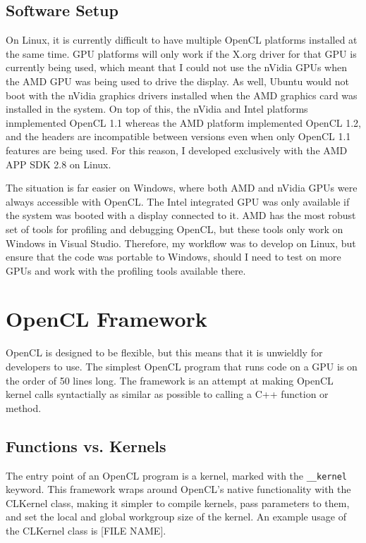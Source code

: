 \documentclass{article}
\begin{document}
\subsection{Software Setup}
On Linux, it is currently difficult to have multiple OpenCL platforms installed at the same time. GPU platforms will only work if the X.org driver for that GPU is currently being used, which meant that I could not use the nVidia GPUs when the AMD GPU was being used to drive the display. As well, Ubuntu would not boot with the nVidia graphics drivers installed when the AMD graphics card was installed in the system. On top of this, the nVidia and Intel platforms inmplemented OpenCL 1.1 whereas the AMD platform implemented OpenCL 1.2, and the headers are incompatible between versions even when only OpenCL 1.1 features are being used. For this reason, I developed exclusively with the AMD APP SDK 2.8 on Linux.

The situation is far easier on Windows, where both AMD and nVidia GPUs were always accessible with OpenCL. The Intel integrated GPU was only available if the system was booted with a display connected to it. AMD has the most robust set of tools for profiling and debugging OpenCL, but these tools only work on Windows in Visual Studio. Therefore, my workflow was to develop on Linux, but ensure that the code was portable to Windows, should I need to test on more GPUs and work with the profiling tools available there.

\section{OpenCL Framework}
OpenCL is designed to be flexible, but this means that it is unwieldly for developers to use. The simplest OpenCL program that runs code on a GPU is on the order of 50 lines long. The framework is an attempt at making OpenCL kernel calls syntactially as similar as possible to calling a C++ function or method.

\subsection{Functions vs. Kernels}
The entry point of an OpenCL program is a kernel, marked with the \texttt{\_\_kernel} keyword. This framework wraps around OpenCL's native functionality with the CLKernel class, making it simpler to compile kernels, pass parameters to them, and set the local and global workgroup size of the kernel. An example usage of the CLKernel class is [FILE NAME].
\end{document}
